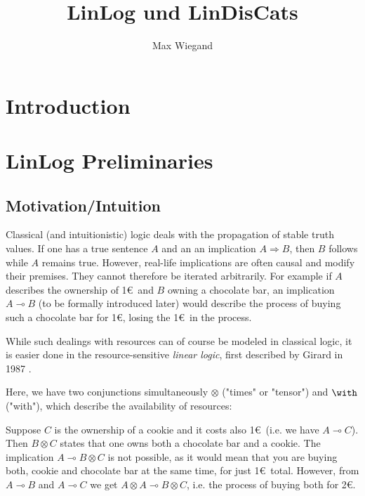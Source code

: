 \documentclass[DIN, pagenumber=false, fontsize=11pt, parskip=half, colorinlistoftodos, svgnames]{scrartcl}
\title{LinLog und LinDisCats}
\author{Max Wiegand}
\begin{document}
	\maketitle
	
	\section{Introduction}
	
	
	\section{LinLog Preliminaries}
	
	
	\subsection{Motivation/Intuition}
	\label{sec: intuition}
	
	
	Classical (and intuitionistic) logic deals with the propagation of stable truth values. If one has a true sentence $A$ and an an implication $A \Rightarrow B$, then $B$ follows while $A$ remains true. However, real-life implications are often causal and modify their premises. They cannot therefore be iterated arbitrarily. For example if $A$ describes the ownership of 1\euro\ and $B$ owning a chocolate bar, an implication $A \multimap B$ (to be formally introduced later) would describe the process of buying such a chocolate bar for 1\euro, losing the 1\euro\ in the process.
	
	While such dealings with resources can of course be modeled in classical logic, it is easier done in the resource-sensitive \emph{linear logic}, first described by Girard in 1987 \cite{girard87}. 
	
	Here, we have two conjunctions simultaneously $\otimes$ ("times" or "tensor") and $\with$ ("with"), which describe the availability of resources:
	
	Suppose $C$ is the ownership of a cookie and it costs also 1\euro\ (i.e. we have $A\multimap C$). Then $B \otimes C$ states that one owns both a chocolate bar and a cookie. The implication $A \multimap B \otimes C$ is not possible, as it would mean that you are buying both, cookie and chocolate bar at the same time, for just 1\euro\ total. However, from $A \multimap B$ and $A\multimap C$ we get $A \otimes A \multimap B \otimes C$, i.e. the process of buying both for 2\euro.
	
\end{document}
